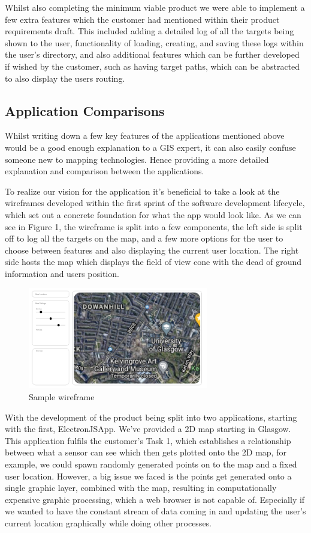 \documentclass{l3proj}
\begin{document}
Whilst also completing the minimum viable product we were able to implement a few extra features which the customer had mentioned within their product requirements draft. This included adding a detailed log of all the targets being shown to the user, functionality of loading, creating, and saving these logs within the user's directory, and also additional features which can be further developed if wished by the customer, such as having target paths, which can be abstracted to also display the users routing.

\subsection{Application Comparisons}

Whilst writing down a few key features of the applications mentioned above would be a good enough explanation to a GIS expert, it can also easily confuse someone new to mapping technologies. Hence providing a more detailed explanation and comparison between the applications.

To realize our vision for the application it's beneficial to take a look at the wireframes developed within the first sprint of the software development lifecycle, which set out a concrete foundation for what the app would look like. As we can see in Figure 1, the wireframe is split into a few components, the left side is split off to log all the targets on the map, and a few more options for the user to choose between features and also displaying the current user location. The right side hosts the map which displays the field of view cone with the dead of ground information and users position.

\begin{figure}[!h]
    \caption{Sample wireframe}
    \centering
    \includegraphics[width=0.7\textwidth]{wireframe.jpg}
\end{figure}

With the development of the product being split into two applications, starting with the first, ElectronJSApp. We've provided a 2D map starting in Glasgow. This application fulfils the customer's Task 1, which establishes a relationship between what a sensor can see which then gets plotted onto the 2D map, for example, we could spawn randomly generated points on to the map and a fixed user location. However, a big issue we faced is the points get generated onto a single graphic layer, combined with the map, resulting in computationally expensive graphic processing, which a web browser is not capable of. Especially if we wanted to have the constant stream of data coming in and updating the user's current location graphically while doing other processes. 
\end{document}
